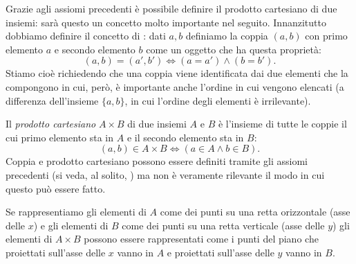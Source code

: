 Grazie agli assiomi precedenti è possibile definire il prodotto cartesiano
di due insiemi: sarà questo un concetto molto importante nel seguito.
Innanzitutto dobbiamo definire il concetto di : dati
$a,b$ definiamo la coppia $(a,b)$ con primo elemento $a$ e secondo elemento $b$
come un oggetto che ha questa proprietà:
\[
  (a, b) = (a', b') \iff (a=a') \land (b=b').
\]
Stiamo cioè richiedendo che una coppia viene identificata dai due
elementi che la compongono in cui, però, è importante anche l'ordine in
cui vengono elencati (a differenza dell'insieme $\{a,b\}$, in cui
l'ordine degli elementi è irrilevante).

Il \emph{prodotto cartesiano} $A\times B$ di due insiemi $A$ e $B$
è l'insieme di tutte le coppie il cui primo elemento sta in $A$ e
il secondo elemento sta in $B$:
\[
  (a, b) \in A \times B \iff (a\in A \land b\in B).
\]
Coppia e prodotto cartesiano possono essere definiti tramite gli
assiomi precedenti (si veda, al solito, \cite{appunti_logica})
ma non è veramente rilevante il modo in cui questo può essere fatto.

Se rappresentiamo gli elementi di $A$ come dei punti su una retta
orizzontale (asse delle $x$) e gli elementi di $B$ come dei punti
su una retta verticale (asse delle $y$) gli elementi di $A\times B$
possono essere rappresentati come i punti del piano che proiettati sull'asse
delle $x$ vanno in $A$ e proiettati sull'asse delle $y$ vanno in $B$.

